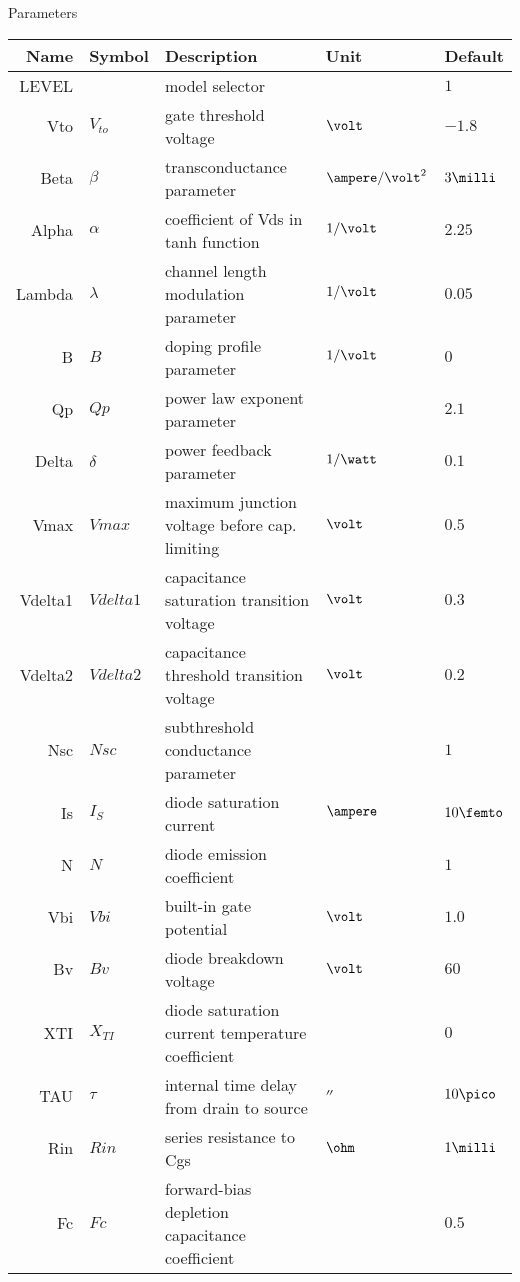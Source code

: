 Parameters
\begin{longtable}{rllll}
Name & Symbol & Description & Unit & Default\\
\hline
\endhead
LEVEL &          & model selector                        &                   & $1$\\
Vto   & $V_{to}$ & gate threshold voltage                & $\volt$           & $-1.8$\\
Beta  & $\beta$  & transconductance parameter            & $\ampere/\volt^2$ & $3\milli$\\
Alpha & $\alpha$ & coefficient of Vds in tanh function   & $1/\volt$         & $2.25$\\
Lambda & $\lambda$ & channel length modulation parameter & $1/\volt$         & $0.05$\\
B      & $B$       & doping profile parameter            & $1/\volt$         & $0$\\
Qp     & $Qp$      & power law exponent parameter       &                   & $2.1$\\
Delta  & $\delta$  & power feedback parameter            & $1/\watt$         & $0.1$\\
Vmax   & $Vmax$    & \parbox[t]{5.5cm}{maximum junction voltage before cap. limiting} & $\volt$ & $0.5$\\
Vdelta1 & $Vdelta1$ & \parbox[t]{5.5cm}{capacitance saturation transition voltage} & $\volt$ & $0.3$\\
Vdelta2 & $Vdelta2$ & \parbox[t]{5.5cm}{capacitance threshold transition voltage}  & $\volt$ & $0.2$\\
Nsc     & $Nsc$     & subthreshold conductance parameter          &          & $1$\\
Is & $I_{S}$ & diode saturation current   & $\ampere$ & $10\femto$\\ 
N  & $N$     & diode emission coefficient &           &  $1$\\
Vbi& $Vbi$   & built-in gate potential   & $\volt$  & $1.0$\\
Bv & $Bv$    & diode breakdown voltage  & $\volt$ & $60$\\
XTI & $X_{TI}$ & \parbox[t]{5.5cm}{diode saturation current temperature coefficient} &   & $0$\\
TAU & $\tau$ & \parbox[t]{5.5cm}{internal time delay from drain to source} & $\second$ & $10\pico$\\
Rin & $Rin$ & series resistance to Cgs & $\ohm$ & $1\milli$\\
Fc  & $Fc$   & \parbox[t]{5.5cm}{forward-bias depletion capacitance coefficient} &     & $0.5$\\

\end{longtable}
